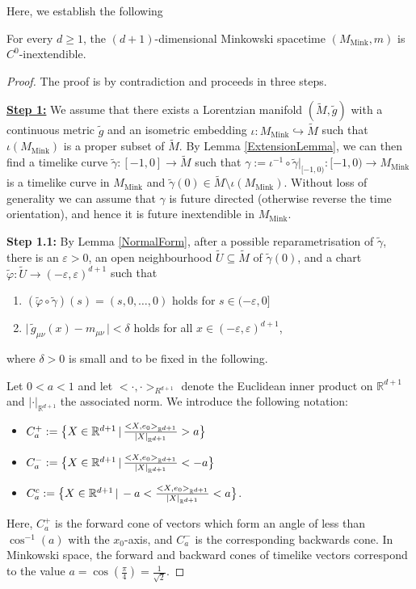 \documentclass[reqno]{article}
\newcommand{\R}{\mathbb{R}}
\newcommand{\ed}{(-\varepsilon, \varepsilon)^{d+1}}
\newcommand{\Mmink}{M_{\mathrm{Mink}}}
\begin{document}
Here, we establish the following 

\begin{theorem}
\label{MinkInex}
For every $d \geq 1$, the $(d+1)$-dimensional Minkowski spacetime $(\Mmink, m)$ is $C^0$-inextendible.
\end{theorem}

\begin{proof}
The proof is by contradiction and proceeds in three steps. 
\vspace*{2mm}

\underline{\textbf{Step 1:}}
We assume that there exists a Lorentzian manifold $(\tilde{M}, \tilde{g})$ with a continuous metric $\tilde{g}$ and an isometric embedding $\iota : \Mmink \hookrightarrow \tilde{M}$ such that $\iota(\Mmink)$ is a proper subset of $\tilde{M}$. By Lemma \ref{ExtensionLemma}, we can then find a timelike curve $\tilde{\gamma} : [-1,0] \to \tilde{M}$ such that $\gamma := \iota^{-1} \circ \tilde{\gamma}|_{[-1,0)} : [-1,0) \to \Mmink$ is a timelike curve in $\Mmink$ and $\tilde{\gamma}(0) \in \tilde{M} \setminus \iota(\Mmink)$. Without loss of generality we can assume that $\gamma$ is future directed (otherwise reverse the time orientation), and hence it is future inextendible in $\Mmink$. 
\vspace*{2mm}

\textbf{Step 1.1:}
By Lemma \ref{NormalForm}, after a possible reparametrisation of $\tilde{\gamma}$, there is an $\varepsilon >0$, an open neighbourhood $\tilde{U} \subseteq \tilde{M}$ of $\tilde{\gamma}(0)$, and a chart $\tilde{\varphi} : \tilde{U} \to \ed$ such that
\begin{enumerate}
\item $(\tilde{\varphi} \circ \tilde{\gamma}) (s) = (s,0, \ldots, 0) $ holds for $s \in (-\varepsilon, 0]$
\item $\big| \,\tilde{g}_{\mu \nu}(x) - m_{\mu \nu} \,\big| < \delta $ holds for all $x \in (-\varepsilon , \varepsilon)^{d+1}$\;,
\end{enumerate}
where $\delta >0$ is small and to be fixed in the following.

Let $ 0 < a < 1$ and let $< \cdot, \cdot>_{R^{d+1}}$ denote the Euclidean inner product on $\R^{d+1}$ and $| \cdot |_{\R^{d+1}}$ the associated norm. We introduce the following notation: 
\begin{itemize}
\item $C^+_a := \big{\{} X \in \R^{d+1} \, | \, \frac{<X,e_0>_{\R^{d+1}}}{|X|_{\R^{d+1}}}   > a \big{\}}$
\item $C^-_a := \big{\{} X \in \R^{d+1} \, | \, \frac{<X,e_0>_{\R^{d+1}}}{|X|_{\R^{d+1}}}   < -a \big{\}}$
\item $C^c_a := \big{\{} X \in \R^{d+1} \, | \, -a < \frac{<X,e_0>_{\R^{d+1}}}{|X|_{\R^{d+1}}}   < a \big{\}}$\;.
\end{itemize}
Here, $C^+_a$ is the forward cone of vectors which form an angle of less than $\cos^{-1}(a)$ with the $x_0$-axis, and $C^-_a$ is the corresponding backwards cone. In Minkowski space, the forward and backward cones of timelike vectors correspond to the value $a = \cos(\frac{\pi}{4}) = \frac{1}{\sqrt{2}}$.


\end{proof}
\end{document}
